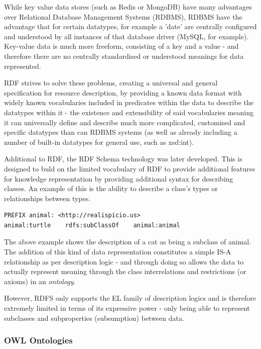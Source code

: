 \documentclass{article}
\begin{document}
While key value data stores (such as Redis or MongoDB) have many advantages over 
Relational Database Management Systems (RDBMS), RDBMS have the advantage that for 
certain datatypes,
for example a 'date' are centrally configured and understood by all instances of
that database driver (MySQL, for example). Key-value data is much more freeform,
consisting of a key and a value - and therefore there are no centrally
standardised or understood meanings for data represented.

RDF strives to solve these problems, creating a universal and general
specification for resource description, by providing a known data format with
widely known vocabularies included in predicates within the data to describe 
the datatypes within it - the existence and extensibility of said vocabularies 
meaning it can universally define and describe much more complicated, customised
and
specific datatypes than can RDBMS systems (as well as already including a number
of built-in datatypes for general use, such as xsd:int). 

Additional to RDF, the RDF Schema\cite{rdfs} technology was later developed. This is
designed to buld on the limited vocabulary of RDF to provide additional features
for knowledge representation by providing additional syntax for describing
classes. An example of this is the ability to describe a class's types or
relationships between types.

\begin{lstlisting}
PREFIX animal: <http://realispicio.us>
animal:turtle    rdfs:subClassOf    animal:animal
\end{lstlisting}

The above example shows the description of a cat as being a subclass of animal.
The addition of this kind of data representation constitutes a simple IS-A
relationship as per description logic\cite{desclogic} - and through 
doing so allows the data to actually represent meaning through the class 
interrelations and restrictions (or axioms) in an \emph{ontology}.

However, RDFS only supports the EL family of description logics and is therefore
extremely limited in terms of its expressive power - only being able to represent 
subclasses and subproperties (subsumption) between data.

\subsubsection{OWL Ontologies}
\end{document}
